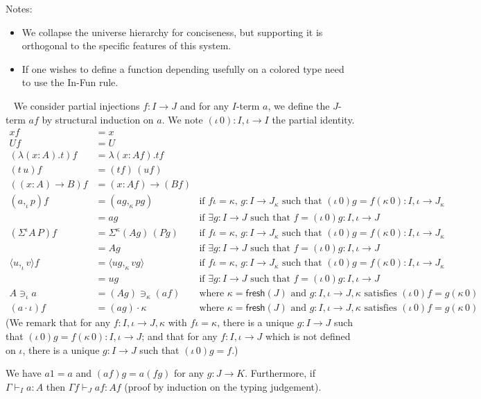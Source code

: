 \documentclass[english]{PaperTools/latex/lipics}
\newcommand\CP[3]{(#2,_{#1} #3)}
\newcommand\op[1]{∋_{#1}}
\newcommand\ip[3]{Σ^{#1} {#2}\,{#3}}
\newcommand\fp[3]{⟨#2 ,_{#1} #3⟩}
\def\fresh#1{\mathsf{fresh}(#1)}
\begin{document}
Notes:

\begin{itemize}
\item We collapse the universe hierarchy for conciseness, but
  supporting it is orthogonal to the specific features of this system.
\item If one wishes to define a function depending usefully on a colored type
  need to use the {\sc In-Fun} rule.
\end{itemize}

\begin{definition}~
  We consider partial injections $f : I → J$ and for any $I$-term $a$,
  we define the $J$-term $af$ by structural induction on $a$.
  We note $(ι\,0) : I,ι → I$ the partial identity.
\begin{align*}
  x f & = x \\
  U f & = U \\
  (λ(x:A).t) f &= λ(x:Af).tf \\
  (t\,u) f &= (tf) \, (uf) \\
  ((x:A)→B) f &= (x:Af)→(Bf) \\
  \CP {ι} a p f &= \CP {κ} {ag} {pg}
    & \text{if $fι = κ$, $g : I→J_κ$ such that $(ι\,0)g = f(κ\,0) : I,ι → J_κ$} \\
                &= ag
    & \text{if $∃g : I→J$ such that $f = (ι\,0)g : I,ι → J$} \\
  (\ip {ι} A P) f &= \ip {κ} {(Ag)} {(Pg)}
    & \text{if $fι = κ$, $g : I→J_κ$ such that $(ι\,0)g = f(κ\,0) : I,ι → J_κ$} \\
                &= Ag
    & \text{if $∃g : I→J$ such that $f = (ι\,0)g : I,ι → J$} \\
  \fp {ι} u v f &= \fp {κ} {ug} {vg}
    & \text{if $fι = κ$, $g : I→J_κ$ such that $(ι\,0)g = f(κ\,0) : I,ι → J_κ$} \\
                &= ug
    & \text{if $∃g : I→J$ such that $f = (ι\,0)g : I,ι → J$} \\
  A \op {ι} a &= (Ag) \op {κ} (af)
    & \text{where $κ = \fresh J$ and $g:I,ι → J,κ$ satisfies $(ι\,0)f = g(κ\,0)$} \\
  (a · ι) f &= (ag) · κ
    & \text{where $κ = \fresh J$ and $g:I,ι → J,κ$ satisfies $(ι\,0)f = g(κ\,0)$}
\end{align*}
  (We remark that for any $f : I,ι → J,κ$ with $fι=κ$, there is a
  unique $g : I → J$ such that $(ι\,0)g = f(κ\,0) : I,ι → J$;
  and that for any $f : I,ι → J$ which is not defined on $ι$, there is
  a unique $g : I → J$ such that $(ι\,0)g = f$.)

  We have $a1 = a$ and $(af)g = a(fg)$ for any $g : J → K$.
  Furthermore, if $Γ ⊢_I a : A$ then $Γ f ⊢_J af : Af$ (proof by
  induction on the typing judgement).
\end{definition}
\end{document}

